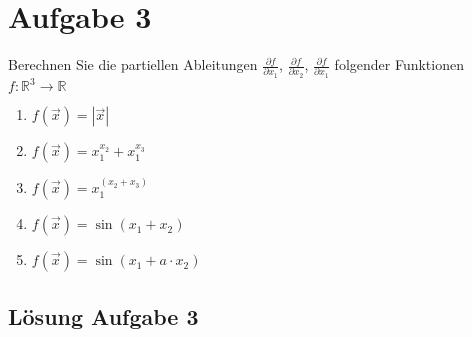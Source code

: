 \documentclass[ngerman, a4paper]{scrartcl}
\begin{document}
	
	\section*{Aufgabe 3}
	Berechnen Sie die partiellen Ableitungen $\frac{\partial f}{\partial x_1}$, $\frac{\partial f}{\partial x_2}$, $\frac{\partial f}{\partial x_1}$ folgender Funktionen $f: \mathbb{R}^3\rightarrow\mathbb{R}$
		
	\begin{enumerate}[\textbf{\alph*)}]
		\item $f(\vec{x}) = |\vec{x}|$
		\item $f(\vec{x}) = x_1^{x_2} + x_1^{x_3}$
		\item $f(\vec{x}) = x_1^{(x_2 + x_3)}$
		\item $f(\vec{x}) = \sin(x_1 + x_2)$
		\item $f(\vec{x}) = \sin(x_1 + a\cdot x_2)$
	\end{enumerate}
	
	\subsection*{Lösung Aufgabe 3}
	
\end{document}
